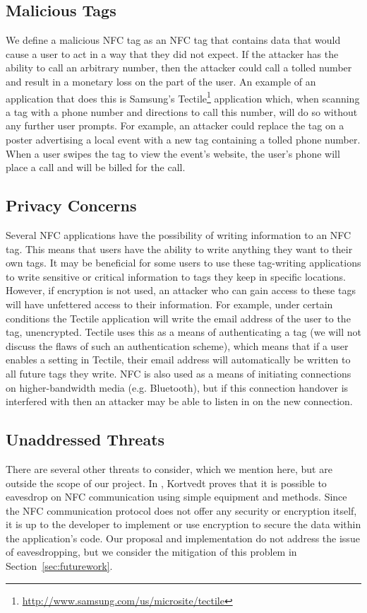 \documentclass[12pt]{article}
\begin{document}
\subsection{Malicious Tags}
We define a malicious NFC tag as an NFC tag that contains data that would cause a user to act in a way that they did not expect.
If the attacker has the ability to call an arbitrary number, then the attacker could call a tolled number and result in a monetary loss on the part of the user. 
An example of an application that does this is Samsung's Tectile\footnote{\url{http://www.samsung.com/us/microsite/tectile}} application which, when scanning a tag with a phone number and directions to call this number, will do so without any further user prompts.
For example, an attacker could replace the tag on a poster advertising a local event with a new tag containing a tolled phone number.
When a user swipes the tag to view the event's website, the user's phone will place a call and will be billed for the call.

\subsection{Privacy Concerns}
\label{sec:threatmodel:privacy}
Several NFC applications have the possibility of writing information to an NFC tag.
This means that users have the ability to write anything they want to their own tags.
It may be beneficial for some users to use these tag-writing applications to write sensitive or critical information to tags they keep in specific locations.
However, if encryption is not used, an attacker who can gain access to these tags will have unfettered access to their information.
For example, under certain conditions the Tectile application will write the email address of the user to the tag, unencrypted.
Tectile uses this as a means of authenticating a tag (we will not discuss the flaws of such an authentication scheme), which means that if a user enables a setting in Tectile, their email address will automatically be written to all future tags they write.
NFC is also used as a means of initiating connections on higher-bandwidth media (e.g. Bluetooth), but if this connection handover is interfered with then an attacker may be able to listen in on the new connection.

\subsection{Unaddressed Threats}
There are several other threats to consider, which we mention here, but are outside the scope of our project.
In \cite{kortvedt2009}, Kortvedt proves that it is possible to eavesdrop on NFC communication using simple equipment and methods.
Since the NFC communication protocol does not offer any security or encryption itself, it is up to the developer to implement or use encryption to secure the data within the application's code. 
Our proposal and implementation do not address the issue of eavesdropping, but we consider the mitigation of this problem in Section~\ref{sec:futurework}.
\end{document}
